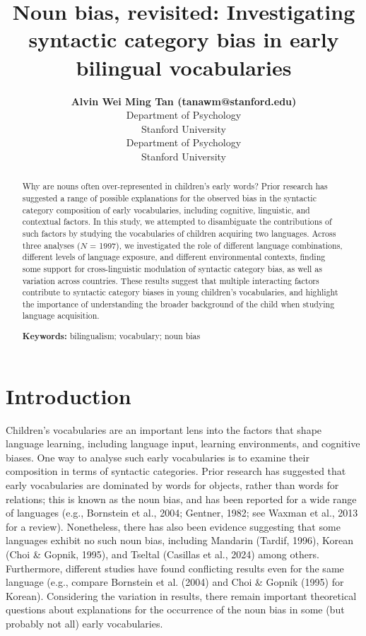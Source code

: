 \documentclass[10pt, letterpaper]{article}
\title{Noun bias, revisited: Investigating syntactic category bias in
early bilingual vocabularies}
\author{{\large \bf Alvin Wei Ming Tan (tanawm@stanford.edu)} \\ Department of Psychology \\ Stanford University \AND {\large \bf Michael C. Frank} \\ Department of Psychology \\ Stanford University}
\begin{document}
\maketitle

\begin{abstract}
Why are nouns often over-represented in children's early words? Prior
research has suggested a range of possible explanations for the observed
bias in the syntactic category composition of early vocabularies,
including cognitive, linguistic, and contextual factors. In this study,
we attempted to disambiguate the contributions of such factors by
studying the vocabularies of children acquiring two languages. Across
three analyses (\(N\) = 1997), we investigated the role of different
language combinations, different levels of language exposure, and
different environmental contexts, finding some support for
cross-linguistic modulation of syntactic category bias, as well as
variation across countries. These results suggest that multiple
interacting factors contribute to syntactic category biases in young
children's vocabularies, and highlight the importance of understanding
the broader background of the child when studying language acquisition.

\textbf{Keywords:}
bilingualism; vocabulary; noun bias
\end{abstract}

\section{Introduction}\label{introduction}

Children's vocabularies are an important lens into the factors that
shape language learning, including language input, learning
environments, and cognitive biases. One way to analyse such early
vocabularies is to examine their composition in terms of syntactic
categories. Prior research has suggested that early vocabularies are
dominated by words for objects, rather than words for relations; this is
known as the noun bias, and has been reported for a wide range of
languages (e.g., Bornstein et al., 2004; Gentner, 1982; see Waxman et
al., 2013 for a review). Nonetheless, there has also been evidence
suggesting that some languages exhibit no such noun bias, including
Mandarin (Tardif, 1996), Korean (Choi \& Gopnik, 1995), and Tseltal
(Casillas et al., 2024) among others. Furthermore, different studies
have found conflicting results even for the same language (e.g., compare
Bornstein et al. (2004) and Choi \& Gopnik (1995) for Korean).
Considering the variation in results, there remain important theoretical
questions about explanations for the occurrence of the noun bias in some
(but probably not all) early vocabularies.
\end{document}
